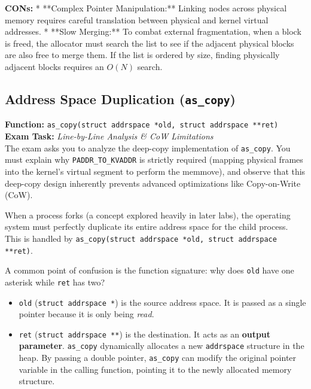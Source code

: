 \textbf{CONs:}
*   **Complex Pointer Manipulation:** Linking nodes across physical memory requires careful translation between physical and kernel virtual addresses.
*   **Slow Merging:** To combat external fragmentation, when a block is freed, the allocator must search the list to see if the adjacent physical blocks are also free to merge them. If the list is ordered by size, finding physically adjacent blocks requires an $O(N)$ search.

\subsection{Address Space Duplication (\texttt{as\_copy})}

\begin{tcolorbox}[colback=red!5!white, colframe=red!75!black, title=\textbf{! EXAM FOCUS: IMPLEMENTATION REQUIRED}]
\textbf{Function:} \texttt{as\_copy(struct addrspace *old, struct addrspace **ret)} \\
\textbf{Exam Task:} \textit{Line-by-Line Analysis \& CoW Limitations} \\
The exam asks you to analyze the deep-copy implementation of \texttt{as\_copy}. You must explain why \texttt{PADDR\_TO\_KVADDR} is strictly required (mapping physical frames into the kernel's virtual segment to perform the memmove), and observe that this deep-copy design inherently prevents advanced optimizations like Copy-on-Write (CoW).
\end{tcolorbox}

When a process forks (a concept explored heavily in later labs), the operating system must perfectly duplicate its entire address space for the child process. This is handled by \texttt{as\_copy(struct addrspace *old, struct addrspace **ret)}.

A common point of confusion is the function signature: why does \texttt{old} have one asterisk while \texttt{ret} has two?
\begin{itemize}
    \item \texttt{old} (\texttt{struct addrspace *}) is the source address space. It is passed as a single pointer because it is only being \textit{read}.
    \item \texttt{ret} (\texttt{struct addrspace **}) is the destination. It acts as an \textbf{output parameter}. \texttt{as\_copy} dynamically allocates a new \texttt{addrspace} structure in the heap. By passing a double pointer, \texttt{as\_copy} can modify the original pointer variable in the calling function, pointing it to the newly allocated memory structure.
\end{itemize}

